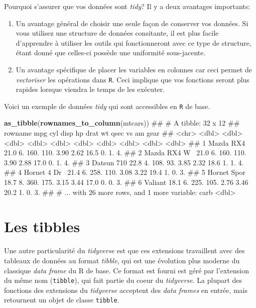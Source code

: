 \documentclass[]{book}
\newenvironment{Shaded}{\begin{snugshade}}{\end{snugshade}}
\newcommand{\KeywordTok}[1]{\textcolor[rgb]{0.13,0.29,0.53}{\textbf{#1}}}
\newcommand{\NormalTok}[1]{#1}
\theoremstyle{definition}
\theoremstyle{definition}
\theoremstyle{definition}
\theoremstyle{remark}
\begin{document}
Pourquoi s'assurer que vos données sont \emph{tidy}? Il y a deux
avantages importants:

\begin{enumerate}
\def\labelenumi{\arabic{enumi}.}
\item
  Un avantage général de choisir une seule façon de conserver vos
  données. Si vous utilisez une structure de données consitante, il est
  plus facile d'apprendre à utiliser les outils qui fonctionneront avec
  ce type de structure, étant donné que celles-ci possède une uniformité
  sous-jacente.
\item
  Un avantage spécifique de placer les variables en colonnes car ceci
  permet de \emph{vectoriser} les opérations dans \texttt{R}. Ceci
  implique que vos fonctions seront plus rapides lorsque viendra le
  temps de les exécuter.
\end{enumerate}

Voici un exemple de données \emph{tidy} qui sont accessibles en
\texttt{R} de base.

\begin{Shaded}
\begin{Highlighting}[]
\KeywordTok{as_tibble}\NormalTok{(}\KeywordTok{rownames_to_column}\NormalTok{(mtcars))}
\NormalTok{## # A tibble: 32 x 12}
\NormalTok{##   rowname        mpg   cyl  disp    hp  drat    wt  qsec    vs    am  gear}
\NormalTok{##   <chr>        <dbl> <dbl> <dbl> <dbl> <dbl> <dbl> <dbl> <dbl> <dbl> <dbl>}
\NormalTok{## 1 Mazda RX4     21.0    6.  160.  110.  3.90  2.62  16.5    0.    1.    4.}
\NormalTok{## 2 Mazda RX4 W~  21.0    6.  160.  110.  3.90  2.88  17.0    0.    1.    4.}
\NormalTok{## 3 Datsun 710    22.8    4.  108.   93.  3.85  2.32  18.6    1.    1.    4.}
\NormalTok{## 4 Hornet 4 Dr~  21.4    6.  258.  110.  3.08  3.22  19.4    1.    0.    3.}
\NormalTok{## 5 Hornet Spor~  18.7    8.  360.  175.  3.15  3.44  17.0    0.    0.    3.}
\NormalTok{## 6 Valiant       18.1    6.  225.  105.  2.76  3.46  20.2    1.    0.    3.}
\NormalTok{## # ... with 26 more rows, and 1 more variable: carb <dbl>}
\end{Highlighting}
\end{Shaded}

\hypertarget{tibbles}{%
\section{Les tibbles}\label{tibbles}}

Une autre particularité du \emph{tidyverse} est que ces extensions
travaillent avec des tableaux de données au format \emph{tibble}, qui
est une évolution plus moderne du classique \emph{data frame} du R de
base. Ce format est fourni est géré par l'extension du même nom
(\texttt{tibble}), qui fait partie du coeur du \emph{tidyverse}. La
plupart des fonctions des extensions du \emph{tidyverse} acceptent des
\emph{data frames} en entrée, mais retournent un objet de classe
\texttt{tibble}.
\end{document}
